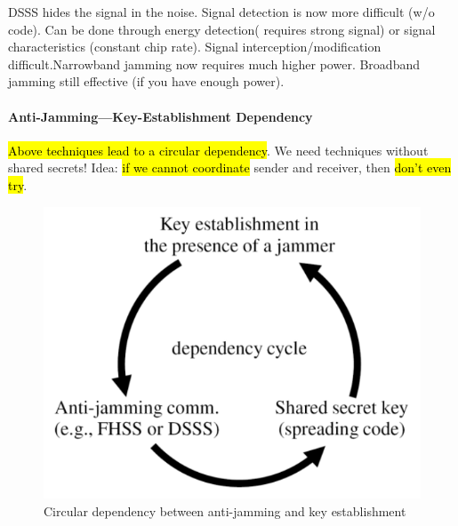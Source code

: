 DSSS hides the signal in the noise. Signal detection is now more difficult (w/o code). Can be done through energy detection( requires strong signal) or signal characteristics (constant chip rate). Signal interception/modification difficult.Narrowband jamming now requires much higher power. Broadband jamming still effective (if you have enough power).



\paragraph{Anti-Jamming---Key-Establishment Dependency}
\hl{Above techniques lead to a circular dependency}.
We need techniques without shared secrets!
Idea: \hl{if we cannot coordinate} sender and receiver, then \hl{don't even try}.

\begin{figure}[h]
	\centering
	\includegraphics[scale=0.3]{images/3-jamming-key-cycle.png}
	\caption{Circular dependency between anti-jamming and key establishment}%
	\label{fig:jamming-key-cycle}
\end{figure}

